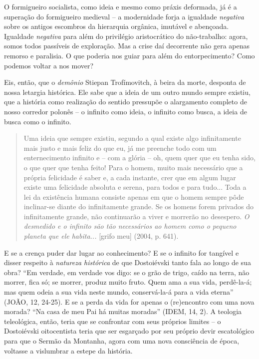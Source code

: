 O formigueiro socialista, como ideia e mesmo como práxis deformada, já é
a superação do formigueiro medieval -- a modernidade forja a igualdade
\emph{negativa} sobre os antigos escombros da hierarquia orgânica,
imutável e abençoada. Igualdade \emph{negativa} para além do privilégio
aristocrático do não-trabalho: agora, somos todos passíveis de
exploração. Mas a crise daí decorrente não gera apenas remorso e
paralisia. O que poderia nos guiar para além do entorpecimento? Como
podemos voltar a nos mover?

Eis, então, que o \emph{demônio} Stiepan Trofímovitch, à beira da morte,
desponta de nossa letargia histórica. Ele sabe que a ideia de um outro
mundo sempre existiu, que a história como realização do sentido
pressupõe o alargamento completo de nosso corredor polonês -- o infinito
como ideia, o infinito como busca, a ideia de busca como o infinito.

\begin{quote}
Uma ideia que sempre existiu, segundo a qual existe algo infinitamente
mais justo e mais feliz do que eu, já me preenche todo com um
enternecimento infinito e -- com a glória -- oh, quem quer que eu tenha
sido, o que quer que tenha feito! Para o homem, muito mais necessário
que a própria felicidade é saber e, a cada instante, crer que em algum
lugar existe uma felicidade absoluta e serena, para todos e para tudo...
Toda a lei da existência humana consiste apenas em que o homem sempre
pôde inclinar-se diante do infinitamente grande. Se os homens forem
privados do infinitamente grande, não continuarão a viver e morrerão no
desespero. \emph{O desmedido e o infinito são tão necessários ao homem
como o pequeno planeta que ele habita...} {[}grifo meu{]} (2004, p.
641).
\end{quote}

E se a crença puder dar lugar ao conhecimento? E se o infinito for
tangível e disser respeito à \emph{natureza histórica} de que
Dostoiévski tanto fala ao longo de sua obra? ``Em verdade, em verdade
vos digo: se o grão de trigo, caído na terra, não morrer, fica só; se
morrer, produz muito fruto. Quem ama a sua vida, perdê-la-á; mas quem
odeia a sua vida neste mundo, conservá-la-á para a vida eterna'' (JOÃO,
12, 24-25). E se a perda da vida for apenas o (re)encontro com uma nova
morada? ``Na casa de meu Pai há muitas moradas'' (IDEM, 14, 2). A
teologia teleológica, então, teria que se confrontar com seus próprios
limites -- o Dostoiévski oitocentista teria que ser esgarçado por seu
próprio devir escatológico para que o Sermão da Montanha, agora com uma
nova consciência de época, voltasse a vislumbrar a estepe da história.

